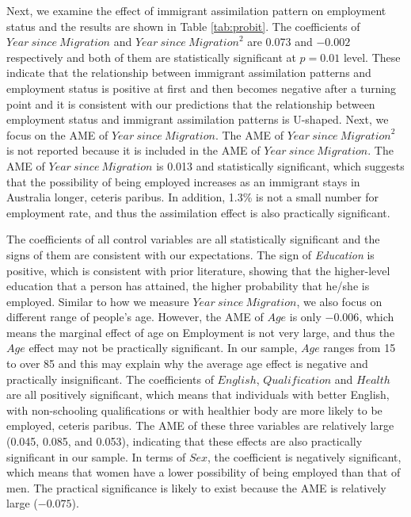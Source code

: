 Next, we examine the effect of immigrant assimilation pattern on employment status and the results are shown in Table \ref{tab:probit}.
The coefficients of $\mathit{Year\ since\ Migration}$ and $\mathit{Year\ since\ Migration}^2$ are 0.073 and $-0.002$ respectively and both of them are statistically significant at $p=0.01$ level.
These indicate that the relationship between immigrant assimilation patterns and employment status is positive at first and then becomes negative after a turning point and it is consistent with our predictions that the relationship between employment status and immigrant assimilation patterns is U-shaped.
Next, we focus on the AME of $\mathit{Year\ since\ Migration}$.
The AME of $\mathit{Year\ since\ Migration}^2$ is not reported because it is included in the AME of $\mathit{Year\ since\ Migration}$.
The AME of $\mathit{Year\ since\ Migration}$ is 0.013 and statistically significant, which suggests that the possibility of being employed increases as an immigrant stays in Australia longer, ceteris paribus.
In addition, 1.3\% is not a small number for employment rate, and thus the assimilation effect is also practically significant.

The coefficients of all control variables are all statistically significant and the signs of them are consistent with our expectations.
The sign of \textit{Education} is positive, which is consistent with prior literature, showing that the higher-level education that a person has attained, the higher probability that he/she is employed.
Similar to how we measure $\mathit{Year\ since\ Migration}$, we also focus on different range of people’s age.
However, the AME of $\mathit{Age}$ is only $-0.006$, which means the marginal effect of age on Employment is not very large, and thus the $\mathit{Age}$ effect may not be practically significant.
In our sample, $\mathit{Age}$ ranges from 15 to over 85 and this may explain why the average age effect is negative and practically insignificant.
The coefficients of $\mathit{English}$, $\mathit{Qualification}$ and $\mathit{Health }$ are all positively significant, which means that individuals with better English, with non-schooling qualifications or with healthier body are more likely to be employed, ceteris paribus.
The AME of these three variables are relatively large  (0.045, 0.085, and 0.053), indicating that these effects are also practically significant in our sample.
In terms of $\mathit{Sex}$, the coefficient is negatively significant, which means that women have a lower possibility of being employed than that of men.
The practical significance is likely to exist because the AME is relatively large ($-0.075$).

